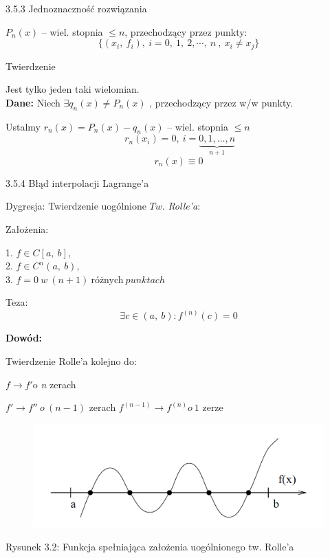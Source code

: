 \begin{frame}{3.5.3 Jednoznaczność rozwiązania}

$P_{n}(x)$ -- wiel. stopnia $\leq n$, przechodzący przez punkty:
$$
\{(x_{i},\ f_{i}),\ i=0,\ 1,\ 2,\cdots ,\ n\ ,\ x_{i}\neq x_{j}\}
$$

\begin{block}{Twierdzenie}

Jest tylko jeden taki wielomian.\\
\vspace{2mm}
\textbf{Dane:} Niech $\exists q_{n}(x)\neq P_{n}(x)$ , przechodzący przez w/w punkty.

Ustalmy $r_{n}(x)=P_{n}(x) - q_{n}(x)$ -- wiel. stopnia $\leq n$
$$
 \: r_{n}(x_{i})=0,\ i=\underbrace{0,1, \dots, n}_{n+1}
$$
$$
r_{n}(x) \equiv 0
$$
\end{block}
\end{frame}

\begin{frame}{3.5.4 Błąd interpolacji Lagrange'a}

\begin{block}
{Dygresja: Twierdzenie uogólnione $Tw$. {\it Rolle'a}:}

Założenia:
\begin{center}
1. $f\in C[a,\ b],$ \\
2. $f\in C^{n}(a,\ b),$  \\
3. $f=0\: w\: (n+1)\: $różnych$ \:punktach$
\end{center}


Teza:
$$
\exists c\in(a,\ b):f^{(n)}(c)=0
$$
\end{block}
\textbf{Dowód:}

Twierdzenie Rolle'a kolejno do:

$f \rightarrow f'\mathrm{o}$ {\it n} zerach

$f' \rightarrow f'' \:o\:(n-1)$ zerach \newline
$f^{(n-1)} \rightarrow f^{(n)} o\: 1$ zerze
 \end{frame}

 \begin{frame}
 \begin{figure}[h]
			\includegraphics[width=1 \linewidth]{img/3/interpol_3_5}
	\end{figure}
Rysunek 3.2: Funkcja spełniająca założenia uogólnionego tw. Rolle'a 
 \end{frame}



